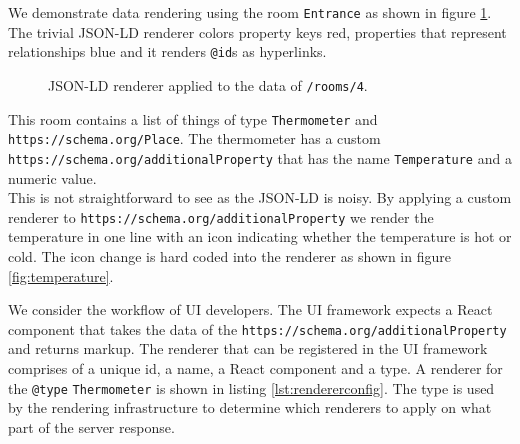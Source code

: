 We demonstrate data rendering using the room \lstinline{Entrance} as shown in figure \ref{fig:entrance}. The trivial JSON-LD renderer colors property keys red, properties that represent relationships blue and it renders \lstinline{@id}s as hyperlinks.

\begin{figure}[!htb]
  \caption{JSON-LD renderer applied to the data of \lstinline{/rooms/4}.}
  \label{fig:entrance}
\end{figure}

This room contains a list of things of type \lstinline{Thermometer} and \lstinline{https://schema.org/Place}. The thermometer has a custom \lstinline{https://schema.org/additionalProperty} that has the name \lstinline{Temperature} and a numeric value. \\
This is not straightforward to see as the JSON-LD is noisy. By applying a custom renderer to \lstinline{https://schema.org/additionalProperty} we render the temperature in one line with an icon indicating whether the temperature is hot or cold. The icon change is hard coded into the renderer as shown in figure \ref{fig:temperature}.

We consider the workflow of UI developers. The UI framework expects a React component that takes the data of the \lstinline{https://schema.org/additionalProperty} and returns markup. The renderer that can be registered in the UI framework comprises of a unique id, a name, a React component and a type. A renderer for the \lstinline{@type} \lstinline{Thermometer} is shown in listing \ref{lst:rendererconfig}. The type is used by the rendering infrastructure to determine which renderers to apply on what part of the server response.

